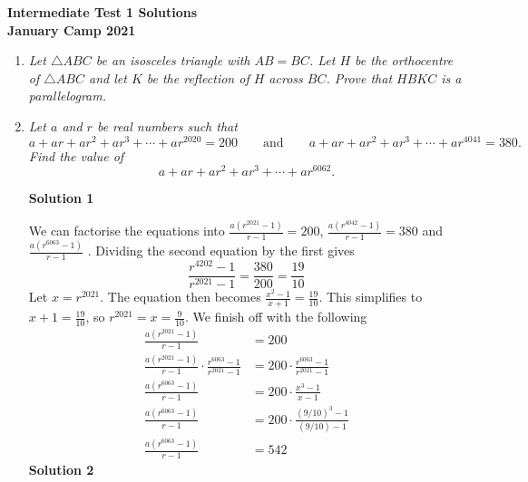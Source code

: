 \documentclass{article}
\begin{document}
\thispagestyle{empty}

\begin{center}
  \textbf{\Large Intermediate Test 1 Solutions}
  \\ \vspace{1em}
  \textbf{\large January Camp 2021}
\end{center}

\vspace{24pt}

\begin{enumerate}[1.]

  \item %
  {\itshape Let $\triangle ABC$ be an isosceles triangle with $AB = BC$. Let $H$ be the orthocentre of $\triangle ABC$ and let $K$ be the reflection of $H$ across $BC$. Prove that $HBKC$ is a parallelogram.}
  
  
  \item %
  {\itshape Let $a$ and $r$ be real numbers such that
  \[ a +ar +ar^2 +ar^3 +\dotsb +ar^{2020} = 200 \qquad\text{and}\qquad a +ar +ar^2 +ar^3 +\dotsb +ar^{4041} = 380. \]
  Find the value of
  \[ a +ar +ar^2 +ar^3 +\dotsb +ar^{6062}. \]}
  
  \textbf{Solution 1}\newline

We can factorise the equations into $\frac{a(r^{2021} - 1)}{r - 1} = 200$, $\frac{a(r^{4042} - 1)}{r - 1} = 380$ and $\frac{a(r^{6063} - 1)}{r - 1}$ . Dividing the second equation by the first gives $$\frac{r^{4202} - 1}{r^{2021} - 1} = \frac{380}{200} = \frac{19}{10}$$ Let $x = r^{2021}$. The equation then becomes $\frac{x^2 - 1}{x + 1} = \frac{19}{10}$. This simplifies to $x + 1 = \frac{19}{10}$, so $r^{2021} = x = \frac{9}{10}$. We finish off with the following
\begin{align*}
\frac{a(r^{2021} - 1)}{r - 1} &= 200\\
\frac{a(r^{2021} - 1)}{r - 1}\cdot \frac{r^{6063} - 1}{r^{2021} - 1} &= 200\cdot \frac{r^{6063} - 1}{r^{2021} - 1}\\
\frac{a(r^{6063} - 1)}{r - 1} &= 200 \cdot \frac{x^3 - 1}{x - 1}\\
\frac{a(r^{6063} - 1)}{r - 1} &= 200 \cdot \frac{(9/10)^3 - 1}{(9/10) - 1}\\
\frac{a(r^{6063} - 1)}{r - 1} &= 542
\end{align*}
\textbf{Solution 2}\newline


\end{enumerate}
\end{document}
